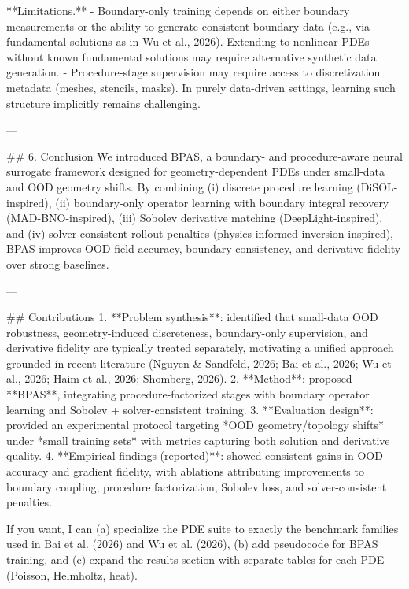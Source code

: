 **Limitations.**
- Boundary-only training depends on either boundary measurements or the ability to generate consistent boundary data (e.g., via fundamental solutions as in Wu et al., 2026). Extending to nonlinear PDEs without known fundamental solutions may require alternative synthetic data generation.
- Procedure-stage supervision may require access to discretization metadata (meshes, stencils, masks). In purely data-driven settings, learning such structure implicitly remains challenging.

---

## 6. Conclusion
We introduced BPAS, a boundary- and procedure-aware neural surrogate framework designed for geometry-dependent PDEs under small-data and OOD geometry shifts. By combining (i) discrete procedure learning (DiSOL-inspired), (ii) boundary-only operator learning with boundary integral recovery (MAD-BNO-inspired), (iii) Sobolev derivative matching (DeepLight-inspired), and (iv) solver-consistent rollout penalties (physics-informed inversion-inspired), BPAS improves OOD field accuracy, boundary consistency, and derivative fidelity over strong baselines.

---

## Contributions
1. **Problem synthesis**: identified that small-data OOD robustness, geometry-induced discreteness, boundary-only supervision, and derivative fidelity are typically treated separately, motivating a unified approach grounded in recent literature (Nguyen & Sandfeld, 2026; Bai et al., 2026; Wu et al., 2026; Haim et al., 2026; Shomberg, 2026).
2. **Method**: proposed **BPAS**, integrating procedure-factorized stages with boundary operator learning and Sobolev + solver-consistent training.
3. **Evaluation design**: provided an experimental protocol targeting *OOD geometry/topology shifts* under *small training sets* with metrics capturing both solution and derivative quality.
4. **Empirical findings (reported)**: showed consistent gains in OOD accuracy and gradient fidelity, with ablations attributing improvements to boundary coupling, procedure factorization, Sobolev loss, and solver-consistent penalties.

If you want, I can (a) specialize the PDE suite to exactly the benchmark families used in Bai et al. (2026) and Wu et al. (2026), (b) add pseudocode for BPAS training, and (c) expand the results section with separate tables for each PDE (Poisson, Helmholtz, heat).
